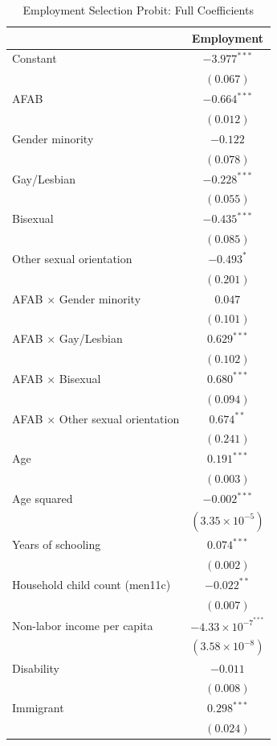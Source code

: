 \begin{table}[htpb]
\caption{Employment Selection Probit: Full Coefficients}
\label{tab:wages_selection_full}
\centering
\begin{tabular}{l c}
\hline
 & Employment \\
\hline
Constant & $-3.977^{***}$ \\
 & $(0.067)$ \\
AFAB & $-0.664^{***}$ \\
 & $(0.012)$ \\
Gender minority & $-0.122$ \\
 & $(0.078)$ \\
Gay/Lesbian & $-0.228^{***}$ \\
 & $(0.055)$ \\
Bisexual & $-0.435^{***}$ \\
 & $(0.085)$ \\
Other sexual orientation & $-0.493^{*}$ \\
 & $(0.201)$ \\
AFAB $\times$ Gender minority & $0.047$ \\
 & $(0.101)$ \\
AFAB $\times$ Gay/Lesbian & $0.629^{***}$ \\
 & $(0.102)$ \\
AFAB $\times$ Bisexual & $0.680^{***}$ \\
 & $(0.094)$ \\
AFAB $\times$ Other sexual orientation & $0.674^{**}$ \\
 & $(0.241)$ \\
Age & $0.191^{***}$ \\
 & $(0.003)$ \\
Age squared & $-0.002^{***}$ \\
 & $(3.35\times 10^{-5})$ \\
Years of schooling & $0.074^{***}$ \\
 & $(0.002)$ \\
Household child count (men11c) & $-0.022^{**}$ \\
 & $(0.007)$ \\
Non-labor income per capita & $-4.33\times 10^{-7}^{***}$ \\
 & $(3.58\times 10^{-8})$ \\
Disability & $-0.011$ \\
 & $(0.008)$ \\
Immigrant & $0.298^{***}$ \\
 & $(0.024)$ \\

\end{tabular}
\end{table}
